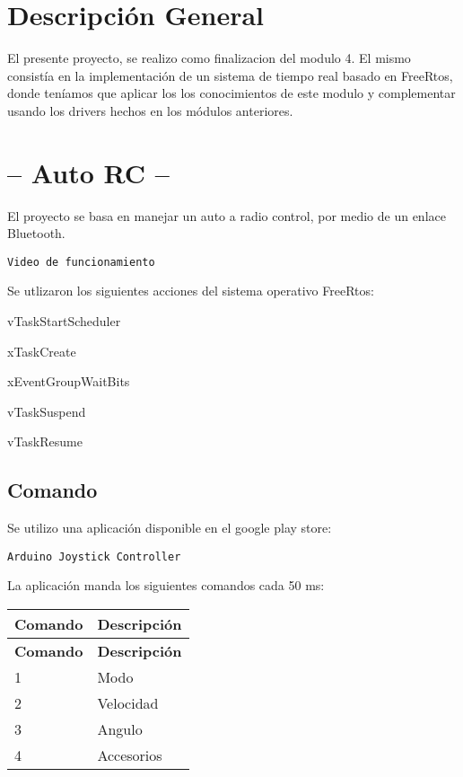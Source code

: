 \section{Descripción General}\label{index_genDesc}
El presente proyecto, se realizo como finalizacion del modulo 4. El mismo consistía en la implementación de un sistema de tiempo real basado en Free\+Rtos, donde teníamos que aplicar los los conocimientos de este modulo y complementar usando los drivers hechos en los módulos anteriores.

\section*{-- Auto RC --}

El proyecto se basa en manejar un auto a radio control, por medio de un enlace Bluetooth.

{\tt Video de funcionamiento }

Se utlizaron los siguientes acciones del sistema operativo Free\+Rtos\+:
\begin{DoxyItemize}
\item v\+Task\+Start\+Scheduler
\item x\+Task\+Create
\item x\+Event\+Group\+Wait\+Bits
\item v\+Task\+Suspend
\item v\+Task\+Resume
\end{DoxyItemize}\subsection{Comando}\label{index_Comando}
Se utilizo una aplicación disponible en el google play store\+:

{\tt Arduino Joystick Controller }

La aplicación manda los siguientes comandos cada 50 ms\+:

\tabulinesep=1mm
\begin{longtabu} spread 0pt [c]{*{2}{|X[-1]}|}
\hline
\rowcolor{\tableheadbgcolor}\textbf{ Comando  }&\textbf{ Descripción   }\\
\endfirsthead
\hline
\endfoot
\hline
\rowcolor{\tableheadbgcolor}\textbf{ Comando  }&\textbf{ Descripción   }\\
  &Modo   \\
2  &Velocidad   \\
3  &Angulo   \\
4  &Accesorios   \\
\end{longtabu}
